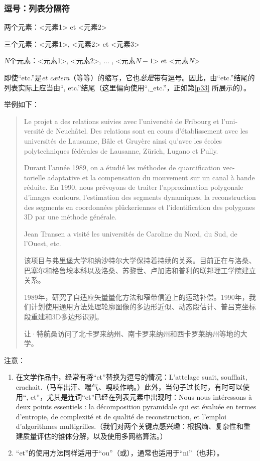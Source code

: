 \begin{mdframed}
    \subsubsection*{逗号：列表分隔符}

    \noindent 两个元素：<元素1> et <元素2>

    \noindent 三个元素：<元素1>, <元素2> et <元素3>

    \noindent $N$个元素：<元素1>, <元素2>, ... , <元素$N-1$> et <元素$N$>
\end{mdframed}

即使``etc.''是\emph{et cætera}（等等）的缩写，它也\emph{总是}带有逗号。因此，由``etc.''结尾的列表实际上应当由``, etc.''结尾（这里偏向使用``,\verb|_|etc.''，正如第\ref{p33}%
所展示的）。

举例如下：

\begin{quote}
    Le projet a des relations suivies avec l'université de Fribourg et l'uni- versité de Neuchâtel. Des relations sont en cours d'établissement avec les universités de Lausanne, Bâle et Gruyère ainsi qu'avec les écoles polytechniques fédérales de Lausanne, Zürich, Lugano et Pully.

    Durant l'année 1989, on a étudié les méthodes de quantification vec- torielle adaptative et la compensation du mouvement sur un canal à bande réduite. En 1990, nous prévoyons de traiter l'approximation polygonale d'images contours, l'estimation des segments dynamiques, la reconstruction des segments en coordonnées plückeriennes et l'identification des polygones 3D par une méthode générale.

    Jean Transen a visité les universités de Caroline du Nord, du Sud, de l'Ouest, etc.

    \begin{bil}
        该项目与弗里堡大学和纳沙特尔大学保持着持续的关系。目前正在与洛桑、巴塞尔和格鲁埃本科以及洛桑、苏黎世、卢加诺和普利的联邦理工学院建立关系。

        1989年，研究了自适应矢量量化方法和窄带信道上的运动补偿。1990年，我们计划使用通用方法处理轮廓图像的多边形近似、动态段估计、普吕克坐标段重建和3D多边形识别。

        让·特航桑访问了北卡罗来纳州、南卡罗来纳州和西卡罗莱纳州等地的大学。
    \end{bil}
\end{quote}

注意：

\begin{enumerate}
    \item 在文学作品中，经常有将``et''替换为逗号的情况：L'attelage suait, soufflait, crachait.（马车出汗、喘气、嘎吱作响。）此外，当句子过长时，有时可以使用``, et''，尤其是连词``et''已经在列表元素中出现时：Nous nous intéressons à deux points essentiels : la décomposition pyramidale qui est évaluée en termes d'entropie, de complexité et de qualité de reconstruction, et l'emploi d'algorithmes multigrilles.（我们对两个关键点感兴趣：根据熵、复杂性和重建质量评估的锥体分解，以及使用多网格算法。）
    \item ``et''的使用方法同样适用于``ou''（或），通常也适用于``ni''（也非）。
\end{enumerate}

